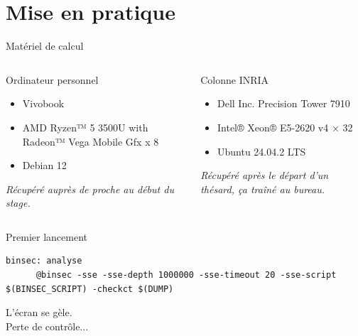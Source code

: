 \documentclass[A4,svgnames,9pt,aspectratio=169]{beamer}
\begin{document}

\section{Mise en pratique}
\frame{\sectionpage}

\begin{frame}{Matériel de calcul}

  \begin{columns}
    \begin{column}{0.5\textwidth}
      \begin{block}{Ordinateur personnel}
        \begin{itemize}
          \item Vivobook
          \item AMD Ryzen™ 5 3500U with Radeon™ Vega Mobile Gfx x 8
          \item Debian 12
        \end{itemize}
        \textit{Récupéré auprès de proche au début du stage.}
      \end{block}
    \end{column}
    \pause
    \begin{column}{0.5\textwidth}
      \begin{block}{Colonne INRIA}
        \begin{itemize}
          \item Dell Inc. Precision Tower 7910
          \item Intel® Xeon® E5-2620 v4 × 32
          \item Ubuntu 24.04.2 LTS
        \end{itemize}
        \textit{Récupéré après le départ d'un thésard, ça traîné au bureau.}
      \end{block}
    \end{column}
  \end{columns}
\end{frame}


\begin{frame}[fragile]{Premier lancement}
  \begin{lstlisting}[style=MakefileStyle, caption={x86\_64/Makefile}, gobble=4]
    binsec: analyse
      @binsec -sse -sse-depth 1000000 -sse-timeout 20 -sse-script $(BINSEC_SCRIPT) -checkct $(DUMP)
  \end{lstlisting}

  \pause
  L'écran se gèle. \\
  Perte de contrôle...
\end{frame}
\end{document}
